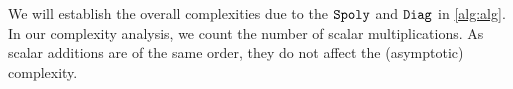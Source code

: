\label{sec:complexity}

We will establish the overall complexities due to the $\texttt{Spoly}$ and $\texttt{Diag}$ in \cref{alg:alg}. In our complexity analysis, we count the number of scalar multiplications.
As scalar additions are of the same order, they do not affect the (asymptotic) complexity.







